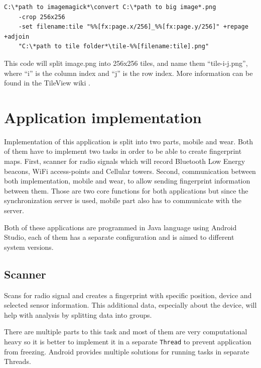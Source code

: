 \begin{lstlisting}[caption=Creating tiles using ImageMagick]
C:\*path to imagemagick*\convert C:\*path to big image*.png 
	-crop 256x256 
	-set filename:tile "%%[fx:page.x/256]_%%[fx:page.y/256]" +repage +adjoin 
	"C:\*path to tile folder*\tile-%%[filename:tile].png"
\end{lstlisting}

This code will split image.png into 256x256 tiles, and name them \enquote{tile-i-j.png}, where \enquote{i} is the column index and \enquote{j} is the row index. More information can be found in the TileView wiki \cite{TileViewWiki}.

\section{Application implementation}\label{sec:ApplicationImplementation}
Implementation of this application is split into two parts, mobile and wear. Both of them have to implement two tasks in order to be able to create fingerprint maps. First, scanner for radio signals which will record Bluetooth Low Energy beacons, WiFi access-points and Cellular towers. Second, communication between both implementation, mobile and wear, to allow sending fingerprint information between them. Those are two core functions for both applications but since the synchronization server is used, mobile part also has to communicate with the server.

Both of these applications are programmed in Java language using Android Studio, each of them has a separate configuration and is aimed to different system versions.

\subsection{Scanner}\label{subsec:Scanner}
Scans for radio signal and creates a fingerprint with specific position, device and selected sensor information. This additional data, especially about the device, will help with analysis by splitting data into groups.

There are multiple parts to this task and most of them are very computational heavy so it is better to implement it in a separate \verb|Thread| to prevent application from freezing. Android provides multiple solutions for running tasks in separate Threads.

